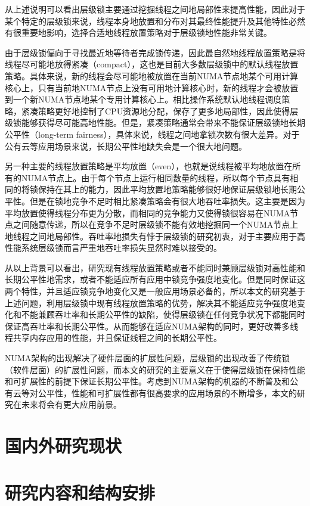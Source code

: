 从上述说明可以看出层级锁主要通过挖掘线程之间地局部性来提高性能，因此对于某个特定的层级锁来说，线程本身地放置和分布对其最终性能提升及其他特性必然有很重要地影响，选择合适地线程放置策略对于层级锁地性能非常关键。

由于层级锁偏向于寻找最近地等待者完成锁传递，因此最自然地线程放置策略是将线程尽可能地放得紧凑（compact），这也是目前大多数层级锁中的默认线程放置策略。具体来说，新的线程会尽可能地被放置在当前NUMA节点地某个可用计算核心上，只有当前地NUMA节点上没有可用地计算核心时，新的线程才会被放置到一个新NUMA节点地某个专用计算核心上。相比操作系统默认地线程调度策略，紧凑策略更好地控制了CPU资源地分配，保存了更多地局部性，因此使得层级锁能够获得尽可能高地性能。但是，紧凑策略通常会带来不能保证层级锁地长期公平性（long-term fairness），具体来说，线程之间地拿锁次数有很大差异。对于公有云等应用场景来说，长期公平性地缺失会是一个很大地问题。

另一种主要的线程放置策略是平均放置（even），也就是说线程被平均地放置在所有的NUMA节点上。由于每个节点上运行相同数量的线程，所以每个节点具有相同的将锁保持在其上的能力，因此平均放置地策略能够很好地保证层级锁地长期公平性。但是在锁地竞争不足时相比紧凑策略会有很大地吞吐率损失。这主要是因为平均放置使得线程分布更为分散，而相同的竞争能力又使得锁很容易在NUMA节点之间随意传递，所以在竞争不足时层级锁不能有效地挖掘同一个NUMA节点上地线程之间地局部性。吞吐率地损失有悖于层级锁的研究初衷，对于主要应用于高性能系统层级锁而言严重地吞吐率损失显然时难以接受的。

从以上背景可以看出，研究现有线程放置策略或者不能同时兼顾层级锁对高性能和长期公平性地需求，或者不能适应所有应用中锁竞争强度地变化。但是同时保证这两个特性，并且适应锁竞争地变化又是一般应用场景必备的，所以本文的研究基于上述问题，利用层级锁中现有线程放置策略的优势，解决其不能适应竞争强度地变化和不能兼顾吞吐率和长期公平性的缺陷，使得层级锁在任何竞争状况下都能同时保证高吞吐率和长期公平性。从而能够在适应NUMA架构的同时，更好改善多线程共享内存应用的性能，并且保证线程之间的长期公平性。

NUMA架构的出现解决了硬件层面的扩展性问题，层级锁的出现改善了传统锁（软件层面）的扩展性问题，而本文的研究的主要意义在于使得层级锁在保持性能和可扩展性的前提下保证长期公平性。考虑到NUMA架构的机器的不断普及和公有云等对公平性，性能和可扩展性都有很高要求的应用场景的不断增多，本文的研究在未来将会有更大应用前景。
\section{国内外研究现状}
\section{研究内容和结构安排}
